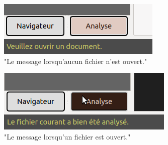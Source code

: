 \documentclass[a4paper,12pt]{article}
\begin{document}
\begin{figure}
	\begin{center}
		\includegraphics[scale=0.5]{images/bouton_2.png}
	\end{center}
	\caption{"Le message lorsqu'aucun fichier n'est ouvert."}
\end{figure}

\begin{figure}
	\begin{center}
		\includegraphics[scale=0.5]{images/bouton_3.png}
	\end{center}
	\caption{"Le message lorsqu'un fichier est ouvert."}
\end{figure}
\end{document}
